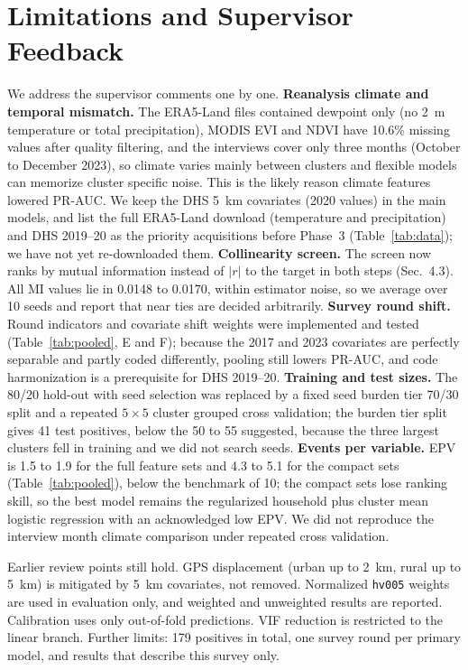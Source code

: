 \documentclass[11pt]{article}
\begin{document}
\section{Limitations and Supervisor Feedback}
\label{sec:lim}
We address the supervisor comments one by one. \textbf{Reanalysis climate and temporal mismatch.} The ERA5-Land files contained dewpoint only (no 2~m temperature or total precipitation), MODIS EVI and NDVI have 10.6\% missing values after quality filtering, and the interviews cover only three months (October to December 2023), so climate varies mainly between clusters and flexible models can memorize cluster specific noise. This is the likely reason climate features lowered PR-AUC. We keep the DHS 5~km covariates (2020 values) in the main models, and list the full ERA5-Land download (temperature and precipitation) and DHS 2019--20 as the priority acquisitions before Phase~3 (Table~\ref{tab:data}); we have not yet re-downloaded them. \textbf{Collinearity screen.} The screen now ranks by mutual information instead of $|r|$ to the target in both steps (Sec.~4.3). All MI values lie in 0.0148 to 0.0170, within estimator noise, so we average over 10 seeds and report that near ties are decided arbitrarily. \textbf{Survey round shift.} Round indicators and covariate shift weights were implemented and tested (Table~\ref{tab:pooled}, E and F); because the 2017 and 2023 covariates are perfectly separable and partly coded differently, pooling still lowers PR-AUC, and code harmonization is a prerequisite for DHS 2019--20. \textbf{Training and test sizes.} The 80/20 hold-out with seed selection was replaced by a fixed seed burden tier 70/30 split and a repeated $5\times5$ cluster grouped cross validation; the burden tier split gives 41 test positives, below the 50 to 55 suggested, because the three largest clusters fell in training and we did not search seeds. \textbf{Events per variable.} EPV is 1.5 to 1.9 for the full feature sets and 4.3 to 5.1 for the compact sets (Table~\ref{tab:pooled}), below the benchmark of 10; the compact sets lose ranking skill, so the best model remains the regularized household plus cluster mean logistic regression with an acknowledged low EPV. We did not reproduce the interview month climate comparison under repeated cross validation.

Earlier review points still hold. GPS displacement (urban up to 2~km, rural up to 5~km) is mitigated by 5~km covariates, not removed. Normalized \texttt{hv005} weights are used in evaluation only, and weighted and unweighted results are reported. Calibration uses only out-of-fold predictions. VIF reduction is restricted to the linear branch. Further limits: 179 positives in total, one survey round per primary model, and results that describe this survey only.
\end{document}
